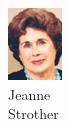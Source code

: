\begin{figure}[H]
\begin{subfigure}[b]{0.1\textwidth}
                \includegraphics[width=\textwidth]{mugs/StrotherJeanne}
                \caption*{Jeanne \\ Strother}
        \end{subfigure}
                        ~ %
        \begin{subfigure}[b]{0.1\textwidth}

\end{subfigure}
\end{figure}

